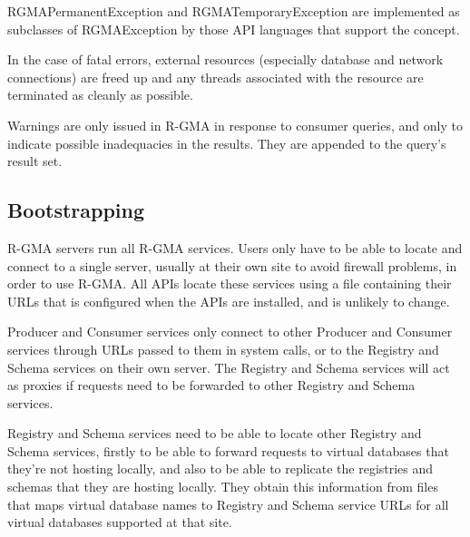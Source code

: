 RGMAPermanentException and RGMATemporaryException are implemented as subclasses of
RGMAException by those API languages that support the concept.

In the case of fatal errors, external resources (especially database
and network connections) are freed up and any threads associated with
the resource are terminated as cleanly as possible.

Warnings are only issued in R-GMA in response to
consumer queries, and only to indicate possible inadequacies in the
results. They are appended to the query's result set.

\subsection{Bootstrapping}\label{sec:BackgroundBootstrapping}

R-GMA servers run all R-GMA services. Users only have to be able to locate and 
connect to a single server, usually at their own site to avoid 
firewall problems, in order to use R-GMA. All APIs locate these 
services using a file containing their URLs that is configured when the APIs 
are installed, and is unlikely to change.

Producer and Consumer services only connect to other Producer and Consumer 
services through URLs passed to them in system calls, or to the Registry and 
Schema services on their own server. The Registry and Schema services will act 
as proxies if requests need to be forwarded to other Registry and Schema 
services.

Registry and Schema services need to be able to locate other Registry and 
Schema services, firstly to be able to forward requests to virtual databases 
that they're not hosting locally, and also to be able to replicate the 
registries and schemas that they are hosting locally. They obtain this 
information from files that maps virtual database names to Registry and Schema 
service URLs for all virtual databases supported at that site.
